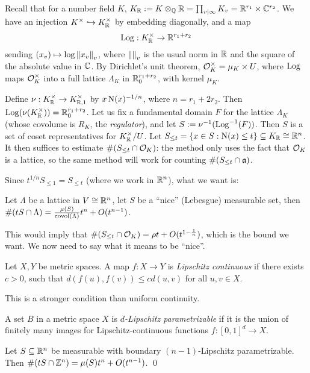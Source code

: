 \documentclass[11pt]{amsart}
\begin{document}
Recall that for a number field $K$, $K_{\mathbb{R}} := K\otimes_{\mathbb{Q}} \mathbb{R} = \prod_{v\mid\infty} K_v = \mathbb{R}^{r_1}\times \mathbb{C}^{r_2}$. We have an injection $K^\times\hookrightarrow K_{\mathbb{R}}^\times$ by embedding diagonally, and a map
\[\operatorname{Log}: K_{\mathbb{R}}^\times \to \mathbb{R}^{r_1+r_2}\]
sending $(x_v)\mapsto \log \left\| x_v \right\|_v$, where $\left\|  \right\|_v$ is the usual norm in $\mathbb{R}$ and the square of the absolute value in $\mathbb{C}$. By Dirichlet's unit theorem, $\mathcal{O}_K^\times = \mu_K\times U$, where $\operatorname{Log}$ maps $\mathcal{O}_K^\times$ into a full lattice $\Lambda_K$ in $\mathbb{R}^{r_1+r_2}_0$, with kernel $\mu_K$.

Define $\nu: K_{\mathbb{R}}^\times \to K_{\mathbb{R},1}^\times$ by $x \operatorname{N}(x)^{-1/n}$, where $n = r_1+2r_2$. Then $\operatorname{Log}(\nu(K_{\mathbb{R}}^\times)) = \mathbb{R}^{r_1+r_2}_0$. Let us fix a fundamental domain $F$ for the lattice $\Lambda_K$ (whose covolume is $R_K$, the \emph{regulator}), and let $S := \nu^{-1}(\operatorname{Log}^{-1}(F))$. Then $S$ is a set of coset representatives for $K_{\mathbb{R}}^\times/U$. Let $S_{\le t} = \{x\in S: \operatorname{N}(x)\le t\} \subseteq K_{\mathbb{R}} \cong \mathbb{R}^n$. It then suffices to estimate $\#(S_{\le t}\cap \mathcal{O}_K)$: the method only uses the fact that $\mathcal{O}_K$ is a lattice, so the same method will work for counting $\#(S_{\le t}\cap \mathfrak{a})$.

Since $t^{1/n}S_{\le 1} = S_{\le t}$ (where we work in $\mathbb{R}^n$), what we want is:

\begin{prop}
    Let $\Lambda$ be a lattice in $V\cong \mathbb{R}^n$, let $S$ be a ``nice'' (Lebesgue) measurable set, then $\#(tS\cap\Lambda) = \frac{\mu(S)}{\operatorname{covol}(\Lambda)}t^n + O(t^{n-1})$.
\end{prop}

This would imply that $\#(S_{\le t}\cap \mathcal{O}_K) = \rho t + O(t^{1-\frac{1}{n}})$, which is the bound we want. We now need to say what it means to be ``nice''.

\begin{defn}
    Let $X,Y$ be metric spaces. A map $f:X\to Y$ is \emph{Lipschitz continuous} if there exists $c>0$, such that $d(f(u),f(v))\le cd(u,v)$ for all $u,v\in X$.
\end{defn}

This is a stronger condition than uniform continuity.


\begin{defn}
    A set $B$ in a metric space $X$ is \emph{$d$-Lipschitz parametrizable} if it is the union of finitely many images for Lipschitz-continuous functions $f:[0,1]^d\to X$.
\end{defn}

\begin{lem}
    Let $S\subseteq \mathbb{R}^n$ be measurable with boundary $(n-1)$-Lipschitz parametrizable. Then $\#(tS\cap \mathbb{Z}^n) = \mu(S)t^n + O(t^{n-1})$. \qed
\end{lem}
\end{document}
